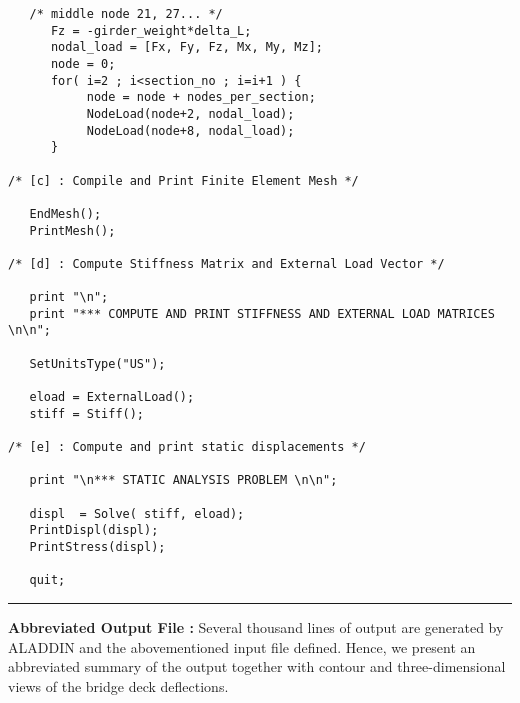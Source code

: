 \begin{footnotesize}
\begin{verbatim}
   /* middle node 21, 27... */
      Fz = -girder_weight*delta_L;
      nodal_load = [Fx, Fy, Fz, Mx, My, Mz];
      node = 0;
      for( i=2 ; i<section_no ; i=i+1 ) {
           node = node + nodes_per_section;
           NodeLoad(node+2, nodal_load);
           NodeLoad(node+8, nodal_load);
      }

/* [c] : Compile and Print Finite Element Mesh */

   EndMesh();
   PrintMesh();

/* [d] : Compute Stiffness Matrix and External Load Vector */

   print "\n";
   print "*** COMPUTE AND PRINT STIFFNESS AND EXTERNAL LOAD MATRICES \n\n";

   SetUnitsType("US");

   eload = ExternalLoad();
   stiff = Stiff();

/* [e] : Compute and print static displacements */

   print "\n*** STATIC ANALYSIS PROBLEM \n\n";

   displ  = Solve( stiff, eload);
   PrintDispl(displ);
   PrintStress(displ);

   quit;
\end{verbatim}
\rule{6.25 in}{0.035 in}
\end{footnotesize}

\vspace{0.25 in}\noindent
{\bf Abbreviated Output File :} Several thousand lines of output are generated
by ALADDIN and the abovementioned input file defined.
Hence, we present an abbreviated summary of the output together with
contour and three-dimensional views of the bridge deck deflections.

